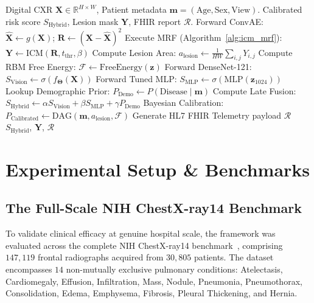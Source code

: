 \documentclass[conference]{IEEEtran}
\begin{document}
\begin{algorithm}[!t]
\caption{Multi-Modal Diagnostic Triage \& PACS Telemetry}
\label{alg:multi_modal_inference}
\begin{algorithmic}[1]
\REQUIRE Digital CXR $\mathbf{X} \in \mathbb{R}^{H \times W}$, Patient metadata $\mathbf{m} = (\text{Age}, \text{Sex}, \text{View})$.
\ENSURE Calibrated risk score $S_{\text{Hybrid}}$, Lesion mask $\mathbf{Y}$, FHIR report $\mathcal{R}$.
\STATE Forward ConvAE: $\hat{\mathbf{X}} \leftarrow g(\mathbf{X})$; $\mathbf{R} \leftarrow (\mathbf{X} - \hat{\mathbf{X}})^2$
\STATE Execute MRF (Algorithm~\ref{alg:icm_mrf}): $\mathbf{Y} \leftarrow \text{ICM}(\mathbf{R}, t_{\text{thr}}, \beta)$
\STATE Compute Lesion Area: $a_{\text{lesion}} \leftarrow \frac{1}{HW} \sum_{i, j} Y_{i, j}$
\STATE Compute RBM Free Energy: $\mathcal{F} \leftarrow \text{FreeEnergy}(\mathbf{z})$
\STATE Forward DenseNet-121: $S_{\text{Vision}} \leftarrow \sigma(f_{\mathbf{\Theta}}(\mathbf{X}))$
\STATE Forward Tuned MLP: $S_{\text{MLP}} \leftarrow \sigma(\text{MLP}(\mathbf{z}_{1024}))$
\STATE Lookup Demographic Prior: $P_{\text{Demo}} \leftarrow P(\text{Disease} \mid \mathbf{m})$
\STATE Compute Late Fusion: $S_{\text{Hybrid}} \leftarrow \alpha S_{\text{Vision}} + \beta S_{\text{MLP}} + \gamma P_{\text{Demo}}$
\STATE Bayesian Calibration: $P_{\text{Calibrated}} \leftarrow \text{DAG}(\mathbf{m}, a_{\text{lesion}}, \mathcal{F})$
\STATE Generate HL7 FHIR Telemetry payload $\mathcal{R}$
\RETURN $S_{\text{Hybrid}}$, $\mathbf{Y}$, $\mathcal{R}$
\end{algorithmic}
\end{algorithm}

\section{Experimental Setup \& Benchmarks}

\subsection{The Full-Scale NIH ChestX-ray14 Benchmark}
To validate clinical efficacy at genuine hospital scale, the framework was evaluated across the complete NIH ChestX-ray14 benchmark~\cite{wang2017chestxray}, comprising $147,119$ frontal radiographs acquired from $30,805$ patients. The dataset encompasses $14$ non-mutually exclusive pulmonary conditions: Atelectasis, Cardiomegaly, Effusion, Infiltration, Mass, Nodule, Pneumonia, Pneumothorax, Consolidation, Edema, Emphysema, Fibrosis, Pleural Thickening, and Hernia.
\end{document}
